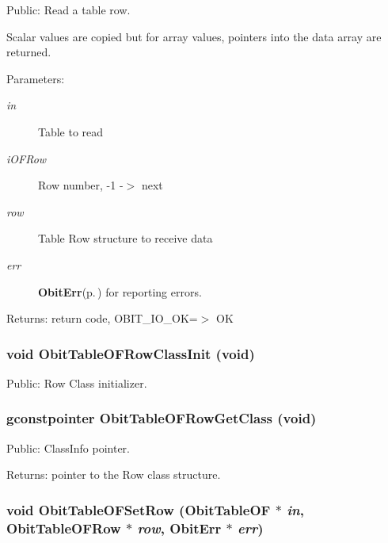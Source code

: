 Public: Read a table row. 

Scalar values are copied but for array values, pointers into the data array are returned. \begin{Desc}
\item[Parameters:]
\begin{description}
\item[{\em in}]Table to read \item[{\em i\-OFRow}]Row number, -1 -$>$ next \item[{\em row}]Table Row structure to receive data \item[{\em err}]{\bf Obit\-Err}{\rm (p.\,\pageref{structObitErr})} for reporting errors. \end{description}
\end{Desc}
\begin{Desc}
\item[Returns:]return code, OBIT\_\-IO\_\-OK=$>$ OK \end{Desc}
\subsubsection{\setlength{\rightskip}{0pt plus 5cm}void Obit\-Table\-OFRow\-Class\-Init (void)}\label{ObitTableOF_8h_a7}


Public: Row Class initializer. 

\subsubsection{\setlength{\rightskip}{0pt plus 5cm}gconstpointer Obit\-Table\-OFRow\-Get\-Class (void)}\label{ObitTableOF_8h_a9}


Public: Class\-Info pointer. 

\begin{Desc}
\item[Returns:]pointer to the Row class structure. \end{Desc}
\subsubsection{\setlength{\rightskip}{0pt plus 5cm}void Obit\-Table\-OFSet\-Row ({\bf Obit\-Table\-OF} $\ast$ {\em in}, {\bf Obit\-Table\-OFRow} $\ast$ {\em row}, {\bf Obit\-Err} $\ast$ {\em err})}\label{ObitTableOF_8h_a19}


